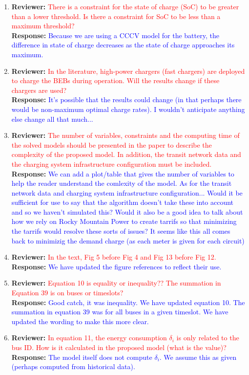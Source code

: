 \documentclass{article}
\newcommand\formatfeedback[2]
{%
	\textbf{Reviewer:} \textcolor{red}{#1} 
	\leavevmode\\[0.1in] \textbf{Response:} \textcolor{blue}{#2}
}
\begin{document}
\begin{enumerate}
	\item \formatfeedback{There is a constraint for the state of charge (SoC) to be greater than a lower threshold. Is there a
constraint for SoC to be less than a maximum threshold?}{Because we are using a CCCV model for the battery, the difference in state of charge decreases as the state of charge approaches its maximum.}
	\item \formatfeedback{In the literature, high-power chargers (fast chargers) are deployed to charge the BEBs during
operation. Will the results change if these chargers are used?}{It's possible that the results could change (in that perhaps there would be non-maximum optimal charge rates).  I wouldn't anticipate anything else change all that much...}
	\item \formatfeedback{The number of variables, constraints and the computing time of the solved models should be
presented in the paper to describe the complexity of the proposed model. In addition, the transit
network data and the charging system infrastructure configuration must be included.}{We can add a plot/table that gives the number of variables to help the reader understand the comlexity of the model.  As for the transit network data and charging system infrastructure configuration... Would it be sufficient for use to say that the algorithm doesn't take these into account and so we haven't simulated this?  Would it also be a good idea to talk about how we rely on Rocky Mountain Power to create tarrifs so that minimizing the tarrifs would resolve these sorts of issues? It seems like this all comes back to minimizig the demand charge (as each meter is given for each circuit)}
	\item \formatfeedback{In the text, Fig 5 before Fig 4 and Fig 13 before Fig 12.}{We have updated the figure references to reflect their use.}
	\item \formatfeedback{Equation 10 is equality or inequality?? The summation in Equation 39 is on buses or timeslots?}{Good catch, it was inequality.  We have updated equation 10. The summation in equation 39 was for all buses in a given timeslot. We have updated the wording to make this more clear.}
	\item \formatfeedback{In equation 11, the energy consumption $\delta_i$ is only related to the bus ID. How is it calculated in
the proposed model (what is the value)?}{The model itself does not compute $\delta_i$. We assume this as given (perhaps computed from historical data).}
\end{enumerate}
\end{document}
